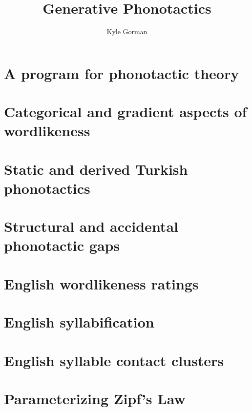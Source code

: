 \documentclass[draft]{upenndiss}
\title{Generative Phonotactics}
\author{Kyle Gorman}
\begin{document}
\FrontMatter

\chapter{A program for phonotactic theory} 
\chapter{Categorical and gradient aspects of wordlikeness} 
\chapter{Static and derived Turkish phonotactics} 
\chapter{Structural and accidental phonotactic gaps} 

\appendix 
\renewcommand{\arraystretch}{0.25}

\chapter{English wordlikeness ratings} 
\chapter{English syllabification} 
\chapter{English syllable contact clusters} 
\chapter{Parameterizing Zipf's Law} 



\end{document}
